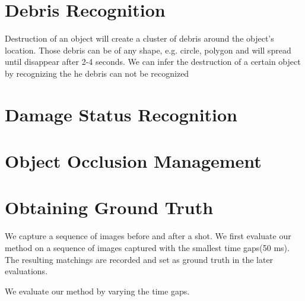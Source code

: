 \documentclass[letterpaper]{article}
\begin{document}
 \section{Debris Recognition}
Destruction of an object will create a cluster of debris around the object's location. Those debris can be of any shape, e.g. circle, polygon and will spread until disappear after 2-4 seconds. We can infer the destruction of a certain object by recognizing the 
he debris can not be recognized 
\section{Damage Status Recognition}


\section{Object Occlusion Management}  




\section{Obtaining Ground Truth}
 We capture a sequence of images before and after a shot. 
We first evaluate our method on a sequence of images captured with the smallest time gaps(50 ms). The resulting matchings are recorded and set as ground truth in the later evaluations. 

We evaluate our method by varying the time gaps.
\end{document}
